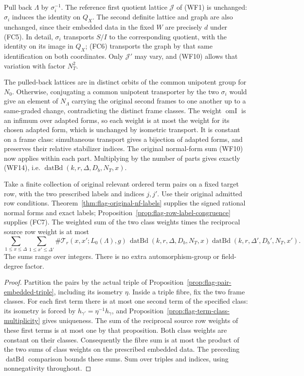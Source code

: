 Pull back \(\Lambda\) by \(\sigma_i^{-1}\).
The reference first quotient lattice \(\mathcal J\) of (WF1)
is unchanged: \(\sigma_i\) induces the identity on \(Q_X\).
The second definite lattice and graph are also unchanged,
since their embedded data in the fixed \(W\) are precisely
\(d\) under (FC5).  In detail, \(\sigma_i\) transports \(S/I\)
to the corresponding quotient, with the identity on its
image in \(Q_X\); (FC6) transports the graph by that
same identification on both coordinates.
Only \(\mathcal J'\) may vary, and (WF10) allows that
variation with factor \(N_T^2\).

The pulled-back lattices are in distinct orbits of the
common unipotent group for \(N_0\).  Otherwise, conjugating
a common unipotent transporter by the two \(\sigma_i\)
would give an element of \(N_\Lambda\) carrying the
original second frames to one another up to a same-graded
change, contradicting the distinct frame classes.
The weight \(\operatorname{omI}\) is an infimum over adapted
forms, so each weight is at most the weight for its
chosen adapted form, which is unchanged by isometric
transport.  It is constant on a frame class: simultaneous
transport gives a bijection of adapted forms, and preserves
their relative stabilizer indices.  The original normal-form
sum (WF10) now applies within each part.  Multiplying by
the number of parts gives exactly (WF14), i.e.
\(\operatorname{datBd}(k,r,\Delta,D_b,N_T,x)\).

\begin{theorem}
\label{thm:weighted-fixed-row-comparison}
Take a finite collection of original relevant ordered term
pairs on a fixed target row, with the two prescribed
labels and indices \(j,j'\).
Use their original admitted row conditions. Theorem~\ref{thm:flag-original-nf-labels}
supplies the signed rational normal forms and exact labels;
Proposition~\ref{prop:flag-row-label-congruence} supplies (FC7).
The weighted sum of the two class weights times the
reciprocal source row weight is at most
\[
 \sum_{1\le x\le\Delta}\sum_{1\le x'\le\Delta'}
 \#\mathcal T_r(x,x';L_0(\Lambda),g)\,
 \operatorname{datBd}(k,r,\Delta,D_b,N_T,x)
 \operatorname{datBd}(k,r,\Delta',D_b',N_T,x').
 \tag{FC9}
\]
The sums range over integers.  There is no extra
automorphism-group or field-degree factor.
\end{theorem}

\begin{proof}
Partition the pairs by the actual triple of
Proposition~\ref{prop:flag-pair-embedded-triple}, including
its isometry \(\eta\).  Inside a triple fibre, fix the
two frame classes.  For each first term there is at most
one second term of the specified class: its isometry
is forced by \(h_{\gamma'}=\eta^{-1}h_\gamma\), and
Proposition~\ref{prop:flag-term-class-multiplicity} gives
uniqueness.  The sum of the reciprocal source row weights
of these first terms is at most one by that proposition.
Both class weights are constant on their classes.
Consequently the fibre sum is at most the product of the
two sums of class weights on the prescribed embedded data.
The preceding \(\operatorname{datBd}\) comparison bounds
these sums.  Sum over triples and indices, using
nonnegativity throughout.
\end{proof}

